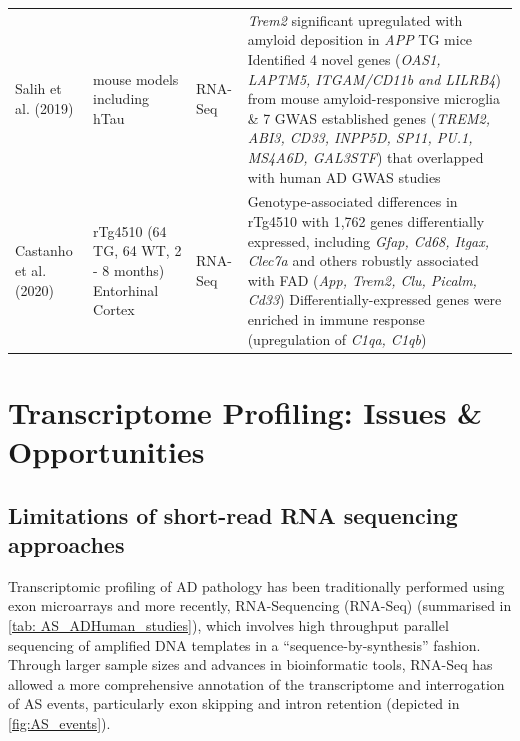 \begin{changemargin}{1.5cm}
\begin{landscape}
\begin{longtable}[c]{p{3cm}p{4cm}p{3cm}p{16cm}}
			\centering Salih et al. (2019) \cite{Salih2019} &
			\centering 5 mouse models including hTau   &
			\centering RNA-Seq &
			\tabitem \textit{Trem2} significant upregulated with amyloid deposition in \textit{APP} TG mice \newline
			\tabitem Identified 4 novel genes (\textit{OAS1, LAPTM5, ITGAM/CD11b and LILRB4}) from mouse amyloid-responsive microglia \& 7 GWAS established genes (\textit{TREM2, ABI3, CD33, INPP5D, SP11, PU.1, MS4A6D, GAL3STF}) that overlapped with human AD GWAS studies \\
			\hdashline[0.5pt/5pt]
			
			\centering Castanho et al. (2020) \cite{Castanho2020} &
			\centering rTg4510 (64 TG, 64 WT, 2 - 8 months) \newline Entorhinal Cortex &
			\centering RNA-Seq &
			\tabitem Genotype-associated differences in rTg4510 with 1,762 genes differentially expressed, including \textit{Gfap, Cd68, Itgax, Clec7a} and others robustly associated with FAD (\textit{App, Trem2, Clu, Picalm, Cd33})  
			\tabitem Differentially-expressed genes were enriched in immune response (upregulation of \textit{C1qa, C1qb})\\* \bottomrule
		\end{longtable}
	\end{landscape}
\end{changemargin}


\section{Transcriptome Profiling: Issues \& Opportunities}
\subsection{Limitations of short-read RNA sequencing approaches}
\label{rnaseq_intro}
Transcriptomic profiling of AD pathology has been traditionally performed using exon microarrays and more recently, RNA-Sequencing (RNA-Seq) (summarised in \cref{tab: AS_ADHuman_studies}), which involves high throughput parallel sequencing of amplified DNA templates in a “sequence-by-synthesis” fashion. Through larger sample sizes and advances in bioinformatic tools, RNA-Seq has allowed a more comprehensive annotation of the transcriptome and interrogation of AS events, particularly exon skipping and intron retention (depicted in \cref{fig:AS_events}). 

